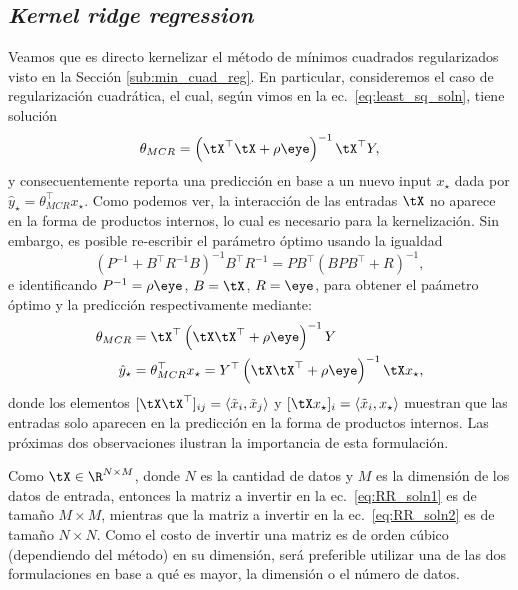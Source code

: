 \subsection{\emph{Kernel ridge regression}}

Veamos que es directo kernelizar el método de mínimos cuadrados regularizados visto en la Sección \ref{sub:min_cuad_reg}. En particular, consideremos el caso de regularización cuadrática, el cual, según vimos en la ec.~\eqref{eq:least_sq_soln}, tiene solución
\begin{equation}
    \theta_{MCR} = \left(\tX^\top\tX +\rho \eye\right)^{-1} \tX^\top Y, \label{eq:RR_soln1} 
\end{equation}
 y consecuentemente reporta una predicción en base a un nuevo input $x_\star$ dada por $\hat{y}_\star = \theta_{MCR}^\top x_\star$. Como podemos ver, la interacción de las entradas $\tX$ no aparece en la forma de productos internos, lo cual es necesario para la kernelización. Sin embargo, es posible re-escribir el parámetro óptimo usando la igualdad 
\begin{equation}
    (P^{-1} + B^\top R^{-1} B)^{-1}B^\top R^{-1}= P B^\top (BP B^\top + R)^{-1},\label{eq:matrix_inversion_lemma}
\end{equation}
e identificando $P^{-1}=\rho\eye$, $B=\tX$, $R=\eye$, para obtener el paámetro óptimo y la predicción respectivamente mediante:  
\begin{align}
   \theta_{MCR}     &= \tX^\top\left(\tX\tX^\top + \rho\eye\right) ^{-1} Y\label{eq:RR_soln2} \\
   \hat{y}_\star    &= \theta_{MCR}^\top x_\star = Y^\top \left(\tX\tX^\top + \rho\eye\right) ^{-1} \tX x_\star, \label{eq:RR_pred} 
\end{align}
donde los elementos $[\tX\tX^\top]_{ij} =\langle \tilde{x}_i,\tilde{x}_j \rangle$ y $[\tX x_\star]_i = \langle \tilde{x}_i,x_\star\rangle$  muestran que las entradas solo aparecen en la predicción en la forma de productos internos. Las próximas dos observaciones ilustran la importancia de esta formulación. 
\begin{remark}
Como $\tX\in\R^{N\times M}$, donde $N$ es la cantidad de datos y $M$ es la dimensión de los datos de entrada, entonces la matriz a invertir en la ec.~\eqref{eq:RR_soln1} es de tamaño $M\times M$, mientras que la matriz a invertir en la ec.~\eqref{eq:RR_soln2} es de tamaño $N\times N$. Como el costo de invertir una matriz es de orden cúbico (dependiendo del método) en su dimensión, será preferible utilizar una de las dos formulaciones en base a qué es mayor, la dimensión o el número de datos. 
\end{remark}

